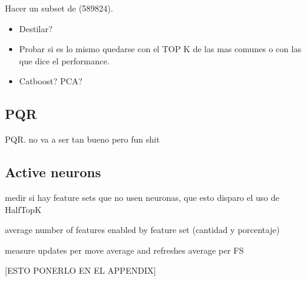 Hacer un subset de  (589824).

\begin{itemize}
\item Destilar?
\item Probar si es lo mismo quedarse con el TOP K de las mas comunes o con las que dice el performance.
\item Catboost? PCA?
\end{itemize}

\subsection{PQR}

PQR. no va a ser tan bueno pero fun shit


\subsection{Active neurons}

medir si hay feature sets que no usen neuronas, que esto disparo el uso de HalfTopK

average number of features enabled by feature set (cantidad y porcentaje)

measure updates per move average and refreshes average per FS

[ESTO PONERLO EN EL APPENDIX]

